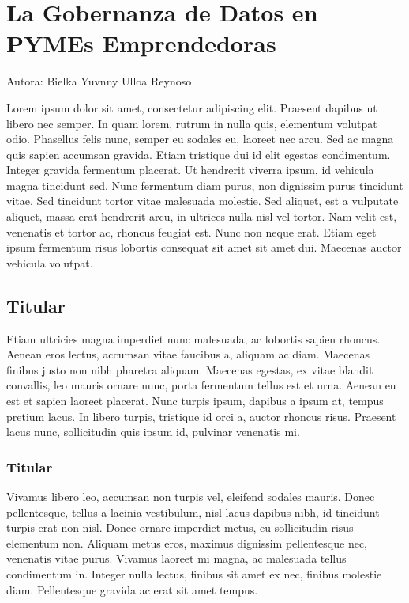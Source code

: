 \documentclass[
  letterpaper,
  DIV=11,
  numbers=noendperiod]{scrreprt}
\begin{document}
\hypertarget{la-gobernanza-de-datos-en-pymes-emprendedoras}{%
\chapter{La Gobernanza de Datos en PYMEs
Emprendedoras}\label{la-gobernanza-de-datos-en-pymes-emprendedoras}}

Autora: Bielka Yuvnny Ulloa Reynoso

Lorem ipsum dolor sit amet, consectetur adipiscing elit. Praesent
dapibus ut libero nec semper. In quam lorem, rutrum in nulla quis,
elementum volutpat odio. Phasellus felis nunc, semper eu sodales eu,
laoreet nec arcu. Sed ac magna quis sapien accumsan gravida. Etiam
tristique dui id elit egestas condimentum. Integer gravida fermentum
placerat. Ut hendrerit viverra ipsum, id vehicula magna tincidunt sed.
Nunc fermentum diam purus, non dignissim purus tincidunt vitae. Sed
tincidunt tortor vitae malesuada molestie. Sed aliquet, est a vulputate
aliquet, massa erat hendrerit arcu, in ultrices nulla nisl vel tortor.
Nam velit est, venenatis et tortor ac, rhoncus feugiat est. Nunc non
neque erat. Etiam eget ipsum fermentum risus lobortis consequat sit amet
sit amet dui. Maecenas auctor vehicula volutpat.

\hypertarget{titular-6}{%
\section{Titular}\label{titular-6}}

Etiam ultricies magna imperdiet nunc malesuada, ac lobortis sapien
rhoncus. Aenean eros lectus, accumsan vitae faucibus a, aliquam ac diam.
Maecenas finibus justo non nibh pharetra aliquam. Maecenas egestas, ex
vitae blandit convallis, leo mauris ornare nunc, porta fermentum tellus
est et urna. Aenean eu est et sapien laoreet placerat. Nunc turpis
ipsum, dapibus a ipsum at, tempus pretium lacus. In libero turpis,
tristique id orci a, auctor rhoncus risus. Praesent lacus nunc,
sollicitudin quis ipsum id, pulvinar venenatis mi.

\hypertarget{titular-7}{%
\subsection{Titular}\label{titular-7}}

Vivamus libero leo, accumsan non turpis vel, eleifend sodales mauris.
Donec pellentesque, tellus a lacinia vestibulum, nisl lacus dapibus
nibh, id tincidunt turpis erat non nisl. Donec ornare imperdiet metus,
eu sollicitudin risus elementum non. Aliquam metus eros, maximus
dignissim pellentesque nec, venenatis vitae purus. Vivamus laoreet mi
magna, ac malesuada tellus condimentum in. Integer nulla lectus, finibus
sit amet ex nec, finibus molestie diam. Pellentesque gravida ac erat sit
amet tempus.
\end{document}
